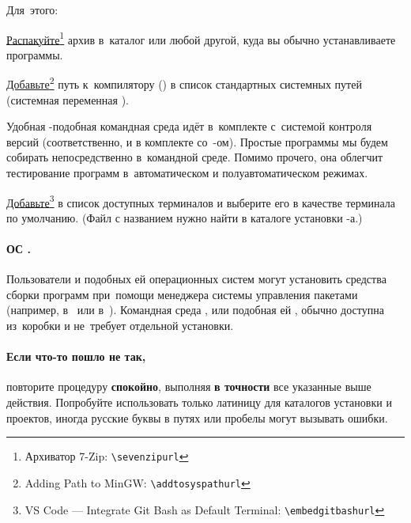 Для~этого:
\begin{itemfeature}
	\item \href{\sevenzipurl}{Распакуйте}\footnote{Архиватор 7-Zip: \nolinkurl{\sevenzipurl}} архив  в~каталог  или любой другой, куда вы обычно устанавливаете программы.

	\item \href{\addtosyspathurl}{Добавьте}\footnote{Adding Path to MinGW: \nolinkurl{\addtosyspathurl}} путь к~компилятору () в список стандартных системных путей (системная переменная ).
\end{itemfeature}

Удобная -подобная командная среда  идёт в~комплекте с~системой контроля версий \git{} (соответственно, и в комплекте со~-ом). Простые программы мы будем собирать непосредственно в~командной среде. Помимо прочего, она облегчит тестирование программ в~автоматическом и полуавтоматическом режимах.

\href{\embedgitbashurl}{Добавьте}\footnote{\textenglish{VS Code --- Integrate Git Bash as Default Terminal}: \nolinkurl{\embedgitbashurl}}  в список доступных терминалов  и выберите его в качестве терминала по умолчанию. (Файл с названием  нужно найти в каталоге установки -а.)



\paragraph{ОС .}
Пользователи  и подобных ей операционных систем могут установить средства сборки программ  \GCC{} при~помощи менеджера системы управления пакетами (например,  в~ или  в~). Командная среда , или подобная ей , обычно доступна из~коробки и не~требует отдельной установки.



\paragraph{Если что-то пошло не так,}
повторите процедуру \textbf{спокойно}, выполняя \textbf{в точности} все указанные выше действия. Попробуйте использовать только латиницу для каталогов установки и проектов, иногда русские буквы в путях или пробелы могут вызывать ошибки.



